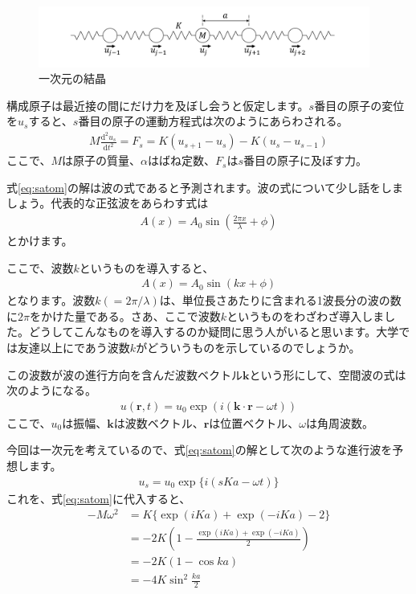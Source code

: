 \documentclass[10pt,b5paper,papersize,dvipdfmx]{jsbook}
\begin{document}
\begin{figure}[htbp]
  \centering
  \includegraphics[height=2cm]{img/bane.pdf}  %
  \caption{一次元の結晶}
  \label{fig:bane}
\end{figure}
構成原子は最近接の間にだけ力を及ぼし会うと仮定します。$s$番目の原子の変位を$u_s$すると、$s$番目の原子の運動方程式は次のようにあらわされる。
\begin{align}
  M\frac{\mathrm{d}^2u_s}{\mathrm{d}t^2} = F_s = K (u_{s+1} - u_s) - K (u_s - u_{s-1})
  \label{eq:satom}
\end{align}
ここで、$M$は原子の質量、$\alpha$はばね定数、$F_s$は$s$番目の原子に及ぼす力。\par
式\ref{eq:satom}の解は波の式であると予測されます。波の式について少し話をしましょう。代表的な正弦波をあらわす式は
\begin{align}
  A(x) = A_0 \sin \left(\frac{2\pi x}{\lambda} + \phi \right)
\end{align}
とかけます。\par
ここで、波数$k$というものを導入すると、
\begin{align}
  A(x) = A_0 \sin (kx + \phi)
\end{align}
となります。波数$k (= 2\pi/\lambda)$は、単位長さあたりに含まれる1波長分の波の数に$2\pi$をかけた量である。さあ、ここで波数$k$というものをわざわざ導入しました。どうしてこんなものを導入するのか疑問に思う人がいると思います。大学では友達以上にであう波数$k$がどういうものを示しているのでしょうか。\par
この波数が波の進行方向を含んだ波数ベクトル$\bm{k}$という形にして、空間波の式は次のようになる。
\begin{align}
  u(\bm{r},t) = u_0 \exp(i(\bm{k} \cdot \bm{r} - \omega t))
\end{align}
ここで、$u_0$は振幅、$\bm{k}$は波数ベクトル、$\bm{r}$は位置ベクトル、$\omega$は角周波数。\par
今回は一次元を考えているので、式\ref{eq:satom}の解として次のような進行波を予想します。
\begin{align}
  u_s = u_0 \exp\{i(sKa - \omega t)\}
\end{align}
これを、式\ref{eq:satom}に代入すると、
\begin{align}
  -M\omega^2 &= K\{\exp(iKa) + \exp(-iKa) - 2\} \\
             &= -2K\left(1-\frac{\exp(iKa) + \exp(-iKa)}{2}\right) \\
             &= -2K(1-\cos ka)\\
             &= -4K\sin^2\frac{ka}{2}
\end{align}
\end{document}
